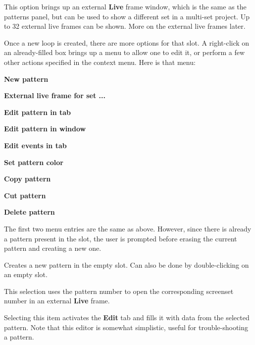    This option brings up an external \textbf{Live} frame window, which
   is the same as the patterns panel, but can be used to show a different set
   in a multi-set project.  Up to 32 external live frames can be shown.
   More on the external live frames later.

   Once a new loop is created, there are more options for that slot.
   A right-click on an already-filled box brings up a menu
   to allow one to edit it, or perform a few other actions
   specified in the context menu.  Here is that menu:

   \begin{enumber}
      \item \textbf{New pattern}
      \item \textbf{External live frame for set ...}
      \item \textbf{Edit pattern in tab}
      \item \textbf{Edit pattern in window}
      \item \textbf{Edit events in tab}
      \item \textbf{Set pattern color}
      \item \textbf{Copy pattern}
      \item \textbf{Cut pattern}
      \item \textbf{Delete pattern}
   \end{enumber}

   The first two menu entries are the same as above.  However, since there is
   already a pattern present in the slot, the user is prompted before erasing
   the current pattern and creating a new one.

   \setcounter{ItemCounter}{0}      %

   Creates a new pattern in the empty slot.
   Can also be done by double-clicking on an empty slot.

   This selection uses the pattern number to open the corresponding screenset
   number in an external \textbf{Live} frame.

   Selecting this item activates the \textbf{Edit} tab and fills it with data
   from the selected pattern.
   Note that this editor is somewhat simplistic, useful for trouble-shooting a
   pattern.

